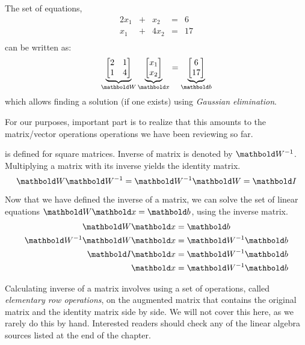 The set of equations,
    \[
      \begin{array}{rcrcr}
        2x_{1} &+& x_{2}  &=& 6 \\
        x_{1}  &+& 4x_{2} &=& 17 \\
      \end{array}
    \]
    can be written as:
    \[
      \underbrace{\begin{bmatrix} 
        2 & 1 \\ 
        1 & 4 \\ 
      \end{bmatrix}}_{\vect{W}}
      \underbrace{\begin{bmatrix} 
        x_{1} \\ 
        x_{2} \\ 
      \end{bmatrix}}_{\vect{x}} 
      = 
      \underbrace{\begin{bmatrix} 
        6 \\ 
        17 \\ 
      \end{bmatrix}}_{\vect{b}}
    \]
which allows finding a solution (if one exists)
using \emph{Gaussian elimination}.

For our purposes,
important part is to realize that
this amounts to the matrix/vector operations operations
we have been reviewing so far.

 is defined for square matrices. 
Inverse of matrix  is denoted by $\vect{W}^{-1}$.
Multiplying a matrix with its inverse yields the identity matrix.
\[
  \vect{W}\vect{W}^{-1} = \vect{W}^{-1} \vect{W} = \vect{I}
\]

Now that we have defined the inverse of a matrix,
we can solve the set of linear equations $\vect{W}\vect{x} = \vect{b}$,
using the inverse matrix.
\[ 
  \begin{aligned}
    \vect{W} \vect{x} &= \vect{b} \\
    \vect{W}^{-1} \vect{W} \vect{x} &= \vect{W}^{-1} \vect{b} \\
    \vect{I} \vect{x} &= \vect{W}^{-1} \vect{b} \\
    \vect{x} &= \vect{W}^{-1} \vect{b} \\
  \end{aligned}
\]

Calculating inverse of a matrix involves using a set of operations,
called \emph{elementary row operations},
on the augmented matrix that contains the original matrix and the identity matrix side by side.
We will not cover this here, as we rarely do this by hand.
Interested readers should check any of the linear algebra sources listed at the end of the chapter.

